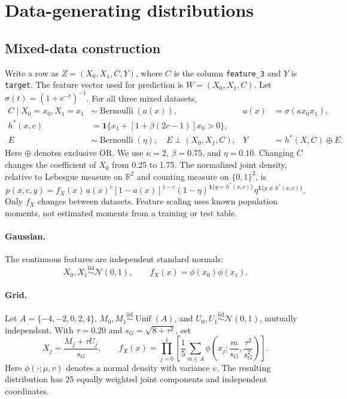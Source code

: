 \documentclass[11pt,letterpaper]{article}
\newcommand{\ind}{\mathbf{1}}
\newcommand{\Normal}{\mathcal{N}}
\begin{document}
\section{Data-generating distributions}
\subsection{Mixed-data construction}
Write a row as $Z=(X_0,X_1,C,Y)$, where $C$ is the column \texttt{feature\_3} and $Y$ is \texttt{target}. The feature vector used for prediction is $W=(X_0,X_1,C)$. Let $\sigma(t)=(1+e^{-t})^{-1}$. For all three mixed datasets,
\begin{align}
 C\mid X_0=x_0,X_1=x_1 &\sim \operatorname{Bernoulli}(a(x)),
 &a(x)&=\sigma(\kappa x_0x_1), \label{eq:category}\\
 h^*(x,c)&=\ind\{x_1+[1+\beta(2c-1)]x_0>0\}, \label{eq:boundary}\\
 E&\sim\operatorname{Bernoulli}(\eta),\quad E\perp(X_0,X_1,C),
 &Y&=h^*(X,C)\mathbin{\oplus} E. \label{eq:noise}
\end{align}
Here $\oplus$ denotes exclusive OR. We use $\kappa=2$, $\beta=0.75$, and $\eta=0.10$. Changing $C$ changes the coefficient of $X_0$ from 0.25 to 1.75. The normalized joint density, relative to Lebesgue measure on $\mathbb{R}^2$ and counting measure on $\{0,1\}^2$, is
\begin{equation}
 p(x,c,y)=f_X(x)\,a(x)^c[1-a(x)]^{1-c}
 (1-\eta)^{\ind\{y=h^*(x,c)\}}\eta^{\ind\{y\ne h^*(x,c)\}}.
 \label{eq:mixedjoint}
\end{equation}
Only $f_X$ changes between datasets. Feature scaling uses known population moments, not estimated moments from a training or test table.

\paragraph{Gaussian.} The continuous features are independent standard normals:
\begin{equation}
 X_0,X_1\stackrel{\mathrm{iid}}{\sim}\Normal(0,1),\qquad
 f_X(x)=\phi(x_0)\phi(x_1).
\end{equation}

\paragraph{Grid.} Let $A=\{-4,-2,0,2,4\}$, $M_0,M_1\stackrel{\mathrm{iid}}{\sim}\operatorname{Unif}(A)$, and $U_0,U_1\stackrel{\mathrm{iid}}{\sim}\Normal(0,1)$, mutually independent. With $\tau=0.20$ and $s_G=\sqrt{8+\tau^2}$, set
\begin{equation}
 X_j=\frac{M_j+\tau U_j}{s_G},\qquad
 f_X(x)=\prod_{j=0}^{1}\left[\frac15\sum_{m\in A}
 \phi\left(x_j;\frac{m}{s_G},\frac{\tau^2}{s_G^2}\right)\right].
 \label{eq:grid}
\end{equation}
Here $\phi(\cdot;\mu,v)$ denotes a normal density with variance $v$. The resulting distribution has 25 equally weighted joint components and independent coordinates.
\end{document}

